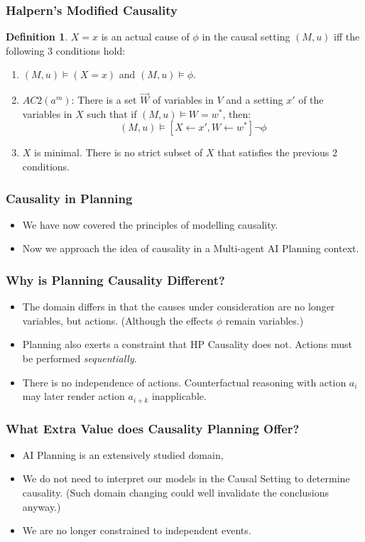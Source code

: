 \documentclass{beamer}
\theoremstyle{plain}
\theoremstyle{definition}
\newtheorem{defn}[thm]{Definition} %
\begin{document}
\begin{frame}
\frametitle{Halpern's Modified Causality}
\begin{defn}$X=x$ is an actual cause of $\phi$ in the causal setting $(M,u)$ iff the following 3 conditions hold:
\begin{enumerate}
\item $(M,u) \models (X=x)$ and $(M,u) \models \phi$.
\item $AC2(a^m)$: There is a set $\vec{W}$ of variables in $V$ and a setting $x'$ of the variables in $X$ such that if $(M,u) \models W = w^*$, then:
\[
(M,u) \models [X \leftarrow x', W \leftarrow w^*] \neg \phi
\]
\item $X$ is minimal. There is no strict subset of $X$ that satisfies the previous 2 conditions.
\end{enumerate}

\end{defn}
\end{frame}


\begin{frame}
\frametitle{Causality in Planning}
\begin{itemize}
\item We have now covered the principles of modelling causality.
\item Now we approach the idea of causality in a Multi-agent AI Planning context.
\end{itemize}

\end{frame}



\begin{frame}
\frametitle{Why is Planning Causality Different?}
\begin{itemize}
\item The domain differs in that the causes under consideration are no longer variables, but actions. (Although the effects $\phi$ remain variables.)
\item Planning also exerts a constraint that HP Causality does not. Actions must be performed \textit{sequentially}.
\item There is no independence of actions. Counterfactual reasoning with action $a_i$ may later render action $a_{i+k}$ inapplicable.
\end{itemize}

\end{frame}


\begin{frame}
\frametitle{What Extra Value does Causality Planning Offer?}
\begin{itemize}
\item AI Planning is an extensively studied domain,
\item We do not need to interpret our models in the Causal Setting to determine causality. (Such domain changing could well invalidate the conclusions anyway.)
\item We are no longer constrained to independent events.
\end{itemize}

\end{frame}
\end{document}
